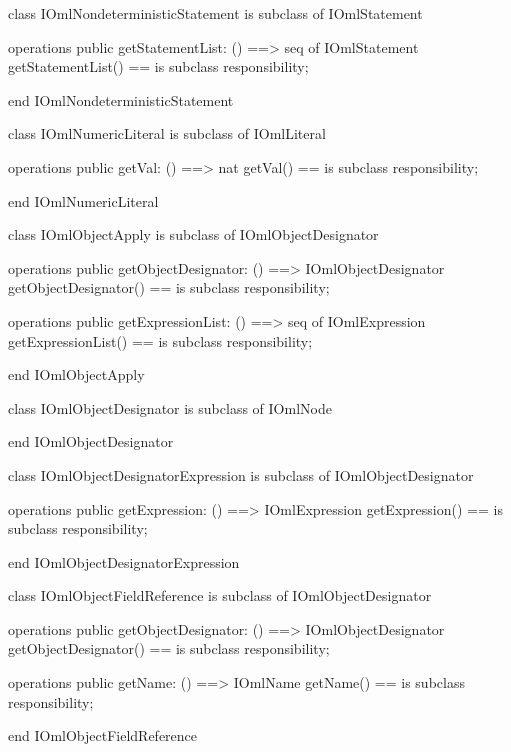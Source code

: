 \begin{vdm_al}
class IOmlNondeterministicStatement
 is subclass of IOmlStatement

operations
  public getStatementList: () ==> seq of IOmlStatement
  getStatementList() == is subclass responsibility;

end IOmlNondeterministicStatement
\end{vdm_al}

\begin{vdm_al}
class IOmlNumericLiteral
 is subclass of IOmlLiteral

operations
  public getVal: () ==> nat
  getVal() == is subclass responsibility;

end IOmlNumericLiteral
\end{vdm_al}

\begin{vdm_al}
class IOmlObjectApply
 is subclass of IOmlObjectDesignator

operations
  public getObjectDesignator: () ==> IOmlObjectDesignator
  getObjectDesignator() == is subclass responsibility;

operations
  public getExpressionList: () ==> seq of IOmlExpression
  getExpressionList() == is subclass responsibility;

end IOmlObjectApply
\end{vdm_al}

\begin{vdm_al}
class IOmlObjectDesignator
 is subclass of IOmlNode

end IOmlObjectDesignator
\end{vdm_al}

\begin{vdm_al}
class IOmlObjectDesignatorExpression
 is subclass of IOmlObjectDesignator

operations
  public getExpression: () ==> IOmlExpression
  getExpression() == is subclass responsibility;

end IOmlObjectDesignatorExpression
\end{vdm_al}

\begin{vdm_al}
class IOmlObjectFieldReference
 is subclass of IOmlObjectDesignator

operations
  public getObjectDesignator: () ==> IOmlObjectDesignator
  getObjectDesignator() == is subclass responsibility;

operations
  public getName: () ==> IOmlName
  getName() == is subclass responsibility;

end IOmlObjectFieldReference
\end{vdm_al}

